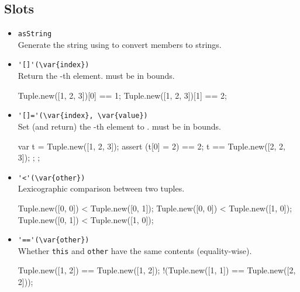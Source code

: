 \subsection{Slots}
\begin{itemize}
\item \lstinline|asString|\\
  Generate the string  using
   to convert members to strings.

\item \lstinline|'[]'(\var{index})|\\
  Return the -th element.   must be in bounds.
\begin{urbiassert}[firstnumber=last]
Tuple.new([1, 2, 3])[0] == 1;
Tuple.new([1, 2, 3])[1] == 2;
\end{urbiassert}

\item \lstinline|'[]='(\var{index}, \var{value})|\\
  Set (and return) the -th element to .
   must be in bounds.
\begin{urbiscript}[firstnumber=last]
{
  var t = Tuple.new([1, 2, 3]);
  assert
  {
    (t[0] = 2) == 2;
    t == Tuple.new([2, 2, 3]);
  };
};
\end{urbiscript}

\item \lstinline|'<'(\var{other})|\\
  Lexicographic comparison between two tuples.
\begin{urbiassert}[firstnumber=last]
Tuple.new([0, 0]) < Tuple.new([0, 1]);
Tuple.new([0, 0]) < Tuple.new([1, 0]);
Tuple.new([0, 1]) < Tuple.new([1, 0]);
\end{urbiassert}

\item \lstinline|'=='(\var{other})|\\
  Whether \lstinline|this| and \lstinline|other| have the same
  contents (equality-wise).
\begin{urbiassert}[firstnumber=last]
  Tuple.new([1, 2]) == Tuple.new([1, 2]);
!(Tuple.new([1, 1]) == Tuple.new([2, 2]));
\end{urbiassert}
\end{itemize}



